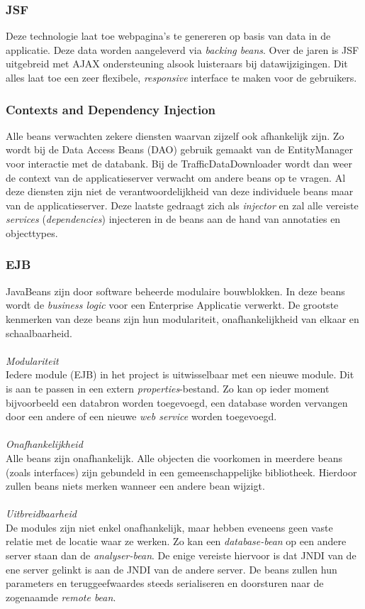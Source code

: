 \documentclass[ps,a4paper,oneside]{report}
\begin{document}
\subsubsection{JSF}
Deze technologie laat toe webpagina's te genereren op basis van data in de applicatie. Deze data worden aangeleverd via \textit{backing beans}. Over de jaren is JSF uitgebreid met AJAX ondersteuning alsook luisteraars bij datawijzigingen. Dit alles laat toe een zeer flexibele, \textit{responsive} interface te maken voor de gebruikers.
\subsubsection{Contexts and Dependency Injection}
Alle beans verwachten zekere diensten waarvan zijzelf ook afhankelijk zijn. Zo wordt bij de Data Access Beans (DAO) gebruik gemaakt van de EntityManager voor interactie met de databank. Bij de TrafficDataDownloader wordt dan weer de context van de applicatieserver verwacht om andere beans op te vragen. Al deze diensten zijn niet de verantwoordelijkheid van deze individuele beans maar van de applicatieserver. Deze laatste gedraagt zich als \textit{injector} en zal alle vereiste \textit{services} (\textit{dependencies}) injecteren in de beans aan de hand van annotaties en objecttypes.
\subsubsection{EJB}
JavaBeans zijn door software beheerde modulaire bouwblokken. In deze beans wordt de \textit{business logic} voor een Enterprise Applicatie verwerkt. De grootste kenmerken van deze beans zijn hun modulariteit, onafhankelijkheid van elkaar en schaalbaarheid.\\\\
\textit{Modulariteit}\\
Iedere module (EJB) in het project is uitwisselbaar met een nieuwe module. Dit is aan te passen in een extern \textit{properties}-bestand. Zo kan op ieder moment bijvoorbeeld een databron worden toegevoegd, een database worden vervangen door een andere of een nieuwe \textit{web service} worden toegevoegd.\\\\
\textit{Onafhankelijkheid}\\
Alle beans zijn onafhankelijk. Alle objecten die voorkomen in meerdere beans (zoals interfaces) zijn gebundeld in een gemeenschappelijke bibliotheek. Hierdoor zullen beans niets merken wanneer een andere bean wijzigt.\\\\
\textit{Uitbreidbaarheid}\\
De modules zijn niet enkel onafhankelijk, maar hebben eveneens geen vaste relatie met de locatie waar ze werken. Zo kan een \textit{database-bean} op een andere server staan dan de \textit{analyser-bean}. De enige vereiste hiervoor is dat JNDI van de ene server gelinkt is aan de JNDI van de andere server. De beans zullen hun parameters en teruggeefwaardes steeds serialiseren en doorsturen naar de zogenaamde \textit{remote bean}.
\end{document}
